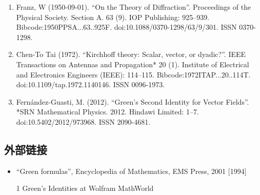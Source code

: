 \begin{enumerate}
\item Franz, W (1950-09-01). “On the Theory of Diffraction”. Proceedings of the Physical Society. Section A. 63 (9). IOP Publishing: 925–939. Bibcode:1950PPSA...63..925F. doi:10.1088/0370-1298/63/9/301. ISSN 0370-1298.
\item Chen-To Tai (1972). “Kirchhoff theory: Scalar, vector, or dyadic?”. IEEE Transactions on Antennas and Propagation* 20 (1). Institute of Electrical and Electronics Engineers (IEEE): 114–115. Bibcode:1972ITAP...20..114T. doi:10.1109/tap.1972.1140146. ISSN 0096-1973.
\item Fernández-Guasti, M. (2012). “Green's Second Identity for Vector Fields”. *SRN Mathematical Physics. 2012. Hindawi Limited: 1–7. doi:10.5402/2012/973968. ISSN 2090-4681.
\end{enumerate}
\subsection{外部链接}
\begin{itemize}
\item “Green formulas”, Encyclopedia of Mathematics, EMS Press, 2001 [1994]
\item [1] Green's Identities at Wolfram MathWorld
\end{itemize}